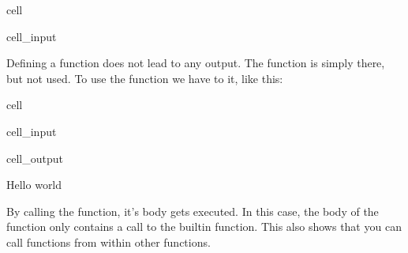 \documentclass[letterpaper,10pt,english]{jupyterBook}
\begin{document}
\begin{sphinxuseclass}{cell}\begin{sphinxVerbatimInput}

\begin{sphinxuseclass}{cell_input}
\begin{sphinxVerbatim}[commandchars=\\\{\}]
         
      
\end{sphinxVerbatim}

\end{sphinxuseclass}\end{sphinxVerbatimInput}

\end{sphinxuseclass}
\sphinxAtStartPar
Defining a function does not lead to any output. The function is simply there, but not used. To use the function we have to  it, like this:

\begin{sphinxuseclass}{cell}\begin{sphinxVerbatimInput}

\begin{sphinxuseclass}{cell_input}
\begin{sphinxVerbatim}[commandchars=\\\{\}]
             
\end{sphinxVerbatim}

\end{sphinxuseclass}\end{sphinxVerbatimInput}
\begin{sphinxVerbatimOutput}

\begin{sphinxuseclass}{cell_output}
\begin{sphinxVerbatim}[commandchars=\\\{\}]
Hello world
\end{sphinxVerbatim}

\end{sphinxuseclass}\end{sphinxVerbatimOutput}

\end{sphinxuseclass}
\sphinxAtStartPar
By calling the function, it’s body gets executed. In this case, the body of the function only contains a call to the built\sphinxhyphen{}in  function. This also shows that you can call functions from within other functions.
\end{document}

